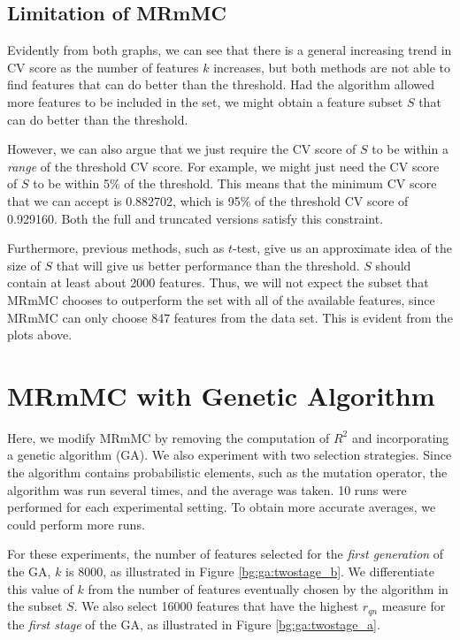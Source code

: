 \documentclass[12pt, twoside, a4paper]{report}
\begin{document}
\subsection{Limitation of MRmMC}

Evidently from both graphs, we can see that there is a general increasing trend in CV score as the number of features $k$ increases, but both methods are not able to find features that can do better than the threshold. Had the algorithm allowed more features to be included in the set, we might obtain a feature subset $S$ that can do better than the threshold.

However, we can also argue that we just require the CV score of $S$ to be within a \textit{range} of the threshold CV score. For example, we might just need the CV score of $S$ to be within 5\% of the threshold. This means that the minimum CV score that we can accept is 0.882702, which is 95\% of the threshold CV score of 0.929160. Both the full and truncated versions satisfy this constraint.

Furthermore, previous methods, such as $t$-test, give us an approximate idea of the size of $S$ that will give us better performance than the threshold. $S$ should contain at least about 2000 features. Thus, we will not expect the subset that MRmMC chooses to outperform the set with all of the available features, since MRmMC can only choose 847 features from the data set. This is evident from the plots above.



\section{MRmMC with Genetic Algorithm} \label{mrmmc_ga_results}

Here, we modify MRmMC by removing the computation of $R^2$ and incorporating a genetic algorithm (GA). We also experiment with two selection strategies. Since the algorithm contains probabilistic elements, such as the mutation operator, the algorithm was run several times, and the average was taken. 10 runs were performed for each experimental setting. To obtain more accurate averages, we could perform more runs.

For these experiments, the number of features selected for the \textit{first generation} of the GA, $k$ is 8000, as illustrated in Figure \ref{bg:ga:twostage_b}. We differentiate this value of $k$ from the number of features eventually chosen by the algorithm in the subset $S$. We also select 16000 features that have the highest $r_{qn}$ measure for the \textit{first stage} of the GA, as illustrated in Figure \ref{bg:ga:twostage_a}.
\end{document}

